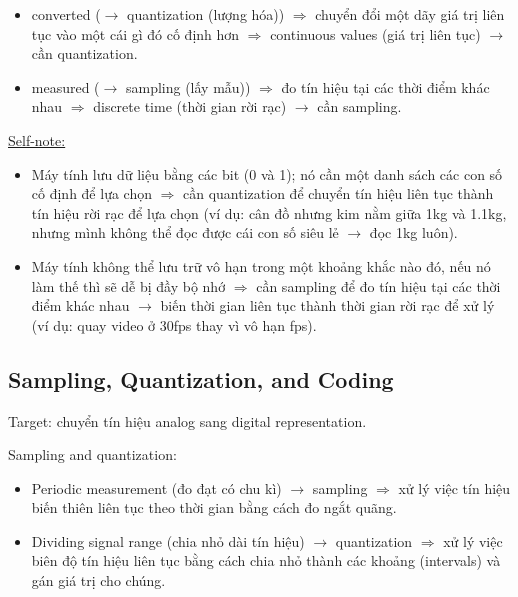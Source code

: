 \begin{itemize}
    \item converted ($\rightarrow$ quantization (lượng hóa)) $\Rightarrow$ chuyển đổi một dãy giá trị liên tục vào một cái gì đó cố định hơn $\Rightarrow$ continuous values (giá trị liên tục) $\rightarrow$ cần quantization.
    \item measured ($\rightarrow$ sampling (lấy mẫu)) $\Rightarrow$ đo tín hiệu tại các thời điểm khác nhau $\Rightarrow$ discrete time (thời gian rời rạc) $\rightarrow$ cần sampling.
\end{itemize}

\noindent
\underline{Self-note:}

\begin{itemize}
    \item Máy tính lưu dữ liệu bằng các bit (0 và 1); nó cần một danh sách các con số cố định để lựa chọn $\Rightarrow$ cần quantization để chuyển tín hiệu liên tục thành tín hiệu rời rạc để lựa chọn (ví dụ: cân đồ nhưng kim nằm giữa 1kg và 1.1kg, nhưng mình không thể đọc được cái con số siêu lẻ $\rightarrow$ đọc 1kg luôn).
    \item Máy tính không thể lưu trữ vô hạn trong một khoảng khắc nào đó, nếu nó làm thế thì sẽ dễ bị đầy bộ nhớ $\Rightarrow$ cần sampling để đo tín hiệu tại các thời điểm khác nhau $\rightarrow$ biến thời gian liên tục thành thời gian rời rạc để xử lý (ví dụ: quay video ở 30fps thay vì vô hạn fps).
\end{itemize}

\subsection{Sampling, Quantization, and Coding}

\noindent
Target: chuyển tín hiệu analog sang digital representation.
\medskip

\noindent
Sampling and quantization:

\begin{itemize}
    \item Periodic measurement (đo đạt có chu kì) $\rightarrow$ sampling $\Rightarrow$ xử lý việc tín hiệu biến thiên liên tục theo thời gian bằng cách đo ngắt quãng.
    \item Dividing signal range (chia nhỏ dài tín hiệu) $\rightarrow$ quantization $\Rightarrow$ xử lý việc biên độ tín hiệu liên tục bằng cách chia nhỏ thành các khoảng (intervals) và gán giá trị cho chúng.
\end{itemize}
\medskip

